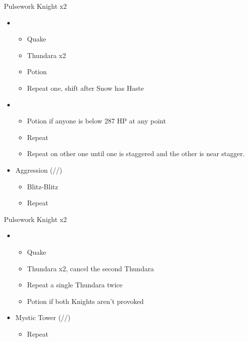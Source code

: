 \begin{paracol}{2}
	\renewcommand{\third}{[3] Mystic Tower (\rav/\sen/\rav)}
	\renewcommand{\fourth}{[4] Mystic Tower (\rav/\sen/\rav)}
	\renewcommand{\fifth}{[5] Malevolence (\rav/\rav/\syn)}
	\renewcommand{\sixth}{[6] Aggression (\com/\com/\rav)}
	\switchcolumn*
	\begin{battle}{Pulsework Knight x2}
		\begin{itemize}
			\item \first
			      \begin{itemize}
				      \item Quake
				      \item Thundara x2
				      \item Potion
				      \item Repeat one, shift after Snow has Haste
			      \end{itemize}
			\item \second
			      \begin{itemize}
				      \item Potion if anyone is below 287 HP at any point
				      \item Repeat
				      \item Repeat on other one until one is staggered and the other is near stagger.
			      \end{itemize}
			\item \sixth
			      \begin{itemize}
				      \item Blitz-Blitz
				      \item Repeat
			      \end{itemize}
		\end{itemize}
	\end{battle}
	\switchcolumn
	\begin{battle}{Pulsework Knight x2}
		\begin{itemize}
			\item \first
			      \begin{itemize}
				      \item Quake
				      \item Thundara x2, cancel the second Thundara
				      \item Repeat a single Thundara twice
				      \item Potion if both Knights aren't provoked
			      \end{itemize}
			\item \third
			      \begin{itemize}
				      \item Repeat

\end{itemize}
\end{itemize}
\end{battle}
\end{paracol}
